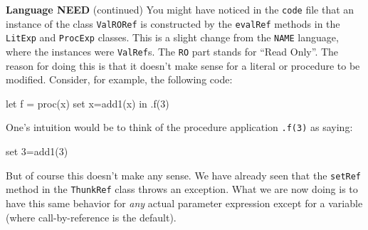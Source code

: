 \begin{minipage}[t]{\sw}
\slidenumber
\LARGE
{\bf Language NEED} (continued)\exx
You might have noticed in the \verb'code' file that an instance
of the class \verb'ValRORef' is constructed
by the \verb'evalRef' methods
in the \verb'LitExp' and \verb'ProcExp' classes.
This is a slight change from the \verb'NAME' language,
where the instances were \verb'ValRef's.
The \verb'RO' part stands for ``Read Only''.
The reason for doing this is that it doesn't make sense
for a literal or procedure to be modified.\exx
Consider, for example, the following code:
\begin{qv}
let
  f = proc(x) set x=add1(x)
in
  .f(3)
\end{qv}
One's intuition would be to think
of the procedure application \verb'.f(3)' as saying:
\begin{qv}
set 3=add1(3)
\end{qv}
But of course this doesn't make any sense.\exx
We have already seen that the \verb'setRef' method
in the \verb'ThunkRef' class throws an exception.
What we are now doing is to have this same behavior
for {\em any} actual parameter expression
except for a variable (where call-by-reference is the default).
\end{minipage}

